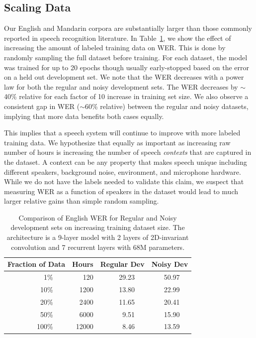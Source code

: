 \documentclass{article}
\begin{document}
\subsection{Scaling Data}

Our English and Mandarin corpora are substantially larger than those commonly reported in speech recognition literature. In Table~\ref{table:datascale}, we show the effect of increasing the amount of labeled training data on WER. This is done by randomly sampling the full dataset before training. For each dataset, the model was trained for up to 20 epochs though usually early-stopped based on the error on a held out development set. We note that the WER decreases with a power law for both the regular and noisy development sets. The WER decreases by $\sim$40\% relative for each factor of 10 increase in training set size. We also observe a consistent gap in WER ($\sim$60\% relative) between the regular and noisy datasets, implying that more data benefits both cases equally. 

This implies that a speech system will continue to improve with more labeled training data. We hypothesize that equally as important as increasing raw number of hours is increasing the number of speech \emph{contexts} that are captured in the dataset. A context can be any property that makes speech unique including different speakers, background noise, environment, and microphone hardware. While we do not have the labels needed to validate this claim, we suspect that measuring WER as a function of speakers in the dataset would lead to much larger relative gains than simple random sampling.

\begin{table}
\centering
\begin{tabular}{r r r  r  r r r  r r r}
\toprule
\multicolumn{3}{c}{Fraction of Data} & Hours & \multicolumn{3}{c}{Regular Dev} & \multicolumn{3}{c}{Noisy Dev} \\
\midrule
& 1\%   & & 120   & & 29.23 & & & 50.97 & \\
& 10\%  & & 1200  & & 13.80 & & & 22.99 & \\
& 20\%  & & 2400  & & 11.65 & & & 20.41 & \\
& 50\%  & & 6000  & & 9.51  & & & 15.90 & \\
& 100\% & & 12000 & & 8.46  & & & 13.59 & \\
\bottomrule
\end{tabular}
\caption{Comparison of English WER for Regular and Noisy development sets on increasing training dataset size. The architecture is a 9-layer model with 2 layers of 2D-invariant convolution and 7 recurrent layers with 68M parameters.}
\label{table:datascale}
\end{table}
\end{document}
